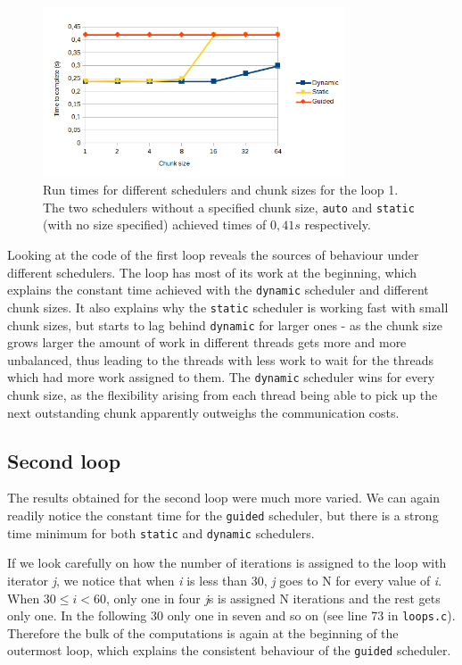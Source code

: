 \documentclass[11pt,a4paper]{article}
\begin{document}
\begin{figure}[h!]
    \begin{center}
        \includegraphics[width=0.8\textwidth]{loop1.png}
    \end{center}
    \caption{Run times for different schedulers and chunk sizes for the loop 1. The two schedulers without a specified chunk size, \texttt{auto} and \texttt{static} (with no size specified) achieved times of \(0,41s\) respectively.}
    \label{loop1}
\end{figure}

Looking at the code of the first loop reveals the sources of behaviour under different schedulers. The loop has most of its work at the beginning, which explains the constant time achieved with the \texttt{dynamic} scheduler and different chunk sizes. It also explains why the \texttt{static} scheduler is working fast with small chunk sizes, but starts to lag behind \texttt{dynamic} for larger ones - as the chunk size grows larger the amount of work in different threads gets more and more unbalanced, thus leading to the threads with less work to wait for the threads which had more work assigned to them. The \texttt{dynamic} scheduler wins for every chunk size, as the flexibility arising from each thread being able to pick up the next outstanding chunk apparently outweighs the communication costs.

\subsection{Second loop}
The results obtained for the second loop were much more varied. We can again readily notice the constant time for the \texttt{guided} scheduler, but there is a strong time minimum for both \texttt{static} and \texttt{dynamic} schedulers.

If we look carefully on how the number of iterations is assigned to the loop with iterator \textit{j}, we notice that when \textit{i} is less than 30, \textit{j} goes to N for every value of \textit{i}. When \(30 \leq i < 60\), only one in four \textit{j}s is assigned N iterations and the rest gets only one. In the following 30 only one in seven and so on (see line 73 in \texttt{loops.c}). Therefore the bulk of the computations is again at the beginning of the outermost loop, which explains the consistent behaviour of the \texttt{guided} scheduler. 
\end{document}
